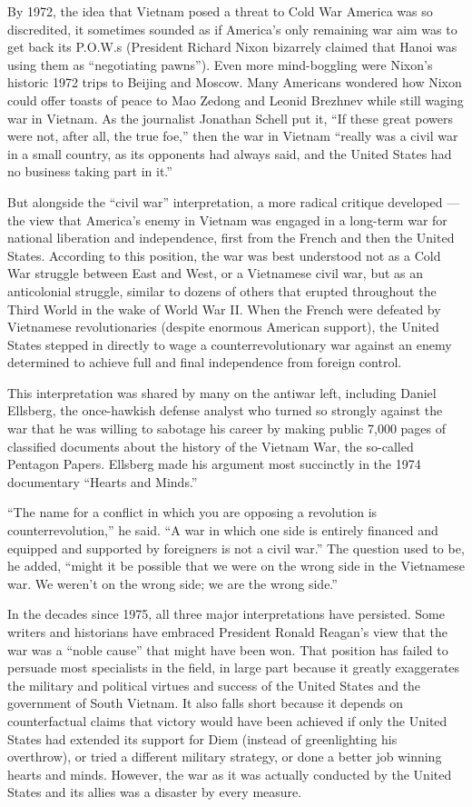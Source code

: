 By 1972, the idea that Vietnam posed a threat to Cold War America was so
discredited, it sometimes sounded as if America's only remaining war aim
was to get back its P.O.W.s (President Richard Nixon bizarrely claimed
that Hanoi was using them as ``negotiating pawns''). Even more
mind-boggling were Nixon's historic 1972 trips to Beijing and Moscow.
Many Americans wondered how Nixon could offer toasts of peace to Mao
Zedong and Leonid Brezhnev while still waging war in Vietnam. As the
journalist Jonathan Schell put it, ``If these great powers were not,
after all, the true foe,'' then the war in Vietnam ``really was a civil
war in a small country, as its opponents had always said, and the United
States had no business taking part in it.''

But alongside the ``civil war'' interpretation, a more radical critique
developed --- the view that America's enemy in Vietnam was engaged in a
long-term war for national liberation and independence, first from the
French and then the United States. According to this position, the war
was best understood not as a Cold War struggle between East and West, or
a Vietnamese civil war, but as an anticolonial struggle, similar to
dozens of others that erupted throughout the Third World in the wake of
World War II. When the French were defeated by Vietnamese
revolutionaries (despite enormous American support), the United States
stepped in directly to wage a counterrevolutionary war against an enemy
determined to achieve full and final independence from foreign control.

This interpretation was shared by many on the antiwar left, including
Daniel Ellsberg, the once-hawkish defense analyst who turned so strongly
against the war that he was willing to sabotage his career by making
public 7,000 pages of classified documents about the history of the
Vietnam War, the so-called Pentagon Papers. Ellsberg made his argument
most succinctly in the 1974 documentary ``Hearts and Minds.''

``The name for a conflict in which you are opposing a revolution is
counterrevolution,'' he said. ``A war in which one side is entirely
financed and equipped and supported by foreigners is not a civil war.''
The question used to be, he added, ``might it be possible that we were
on the wrong side in the Vietnamese war. We weren't on the wrong side;
we are the wrong side.''

In the decades since 1975, all three major interpretations have
persisted. Some writers and historians have embraced President Ronald
Reagan's view that the war was a ``noble cause'' that might have been
won. That position has failed to persuade most specialists in the field,
in large part because it greatly exaggerates the military and political
virtues and success of the United States and the government of South
Vietnam. It also falls short because it depends on counterfactual claims
that victory would have been achieved if only the United States had
extended its support for Diem (instead of greenlighting his overthrow),
or tried a different military strategy, or done a better job winning
hearts and minds. However, the war as it was actually conducted by the
United States and its allies was a disaster by every measure.

